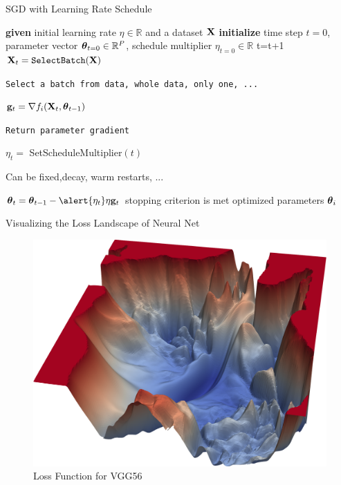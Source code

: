 \documentclass[xcolor=pdftex,dvipsnames,table,mathserif]{beamer}
\begin{document}
\begin{frame}{SGD with Learning Rate Schedule}
\begin{algorithm}[H]
\begin{algorithmic}[1]
\STATE \textbf{given} initial learning rate $\eta \in \mathbb{R}$ and a dataset $\mathbf{X}$
\STATE \textbf{initialize} time step $t=0$, parameter vector $\boldsymbol{\theta}_{t=0} \in \mathbb{R}^P$, schedule multiplier $\eta_{t=0} \in \mathbb{R}$
\REPEAT
\STATE t=t+1
\STATE $\mathbf{X}_t=\texttt{SelectBatch} (\mathbf{X})$ \begin{tiny}\texttt{Select a batch from data, whole data, only one, ... } \end{tiny}
\STATE $\mathbf{g}_t = \nabla f_i(\mathbf{X}_t,\boldsymbol{\theta}_{t-1})$  \begin{tiny}\texttt{Return parameter gradient}\end{tiny}
\STATE \alert{$\eta_t = $ SetScheduleMultiplier$(t)$} \begin{tiny}{Can be fixed,decay, warm restarts, ...}\end{tiny}
\STATE $\param_t=\param_{t-1}  - \alert{\eta_{t}} \eta \mathbf{g}_t$
\UNTIL stopping criterion is met
\RETURN optimized parameters $\boldsymbol{\theta}_i$
\end{algorithmic}
\caption{pseudocode for SGD with Learning Rate Schedule}
\label{alg:seq}
\end{algorithm}
\end{frame}

\begin{frame}{Visualizing the Loss Landscape of Neural Net}
\begin{figure}
\includegraphics[width=.5\columnwidth]{../graphics/VGG56Loss}
\caption{Loss Function for VGG56 \cite{li2017visualizing}}
\end{figure}
\end{frame}
\end{document}
